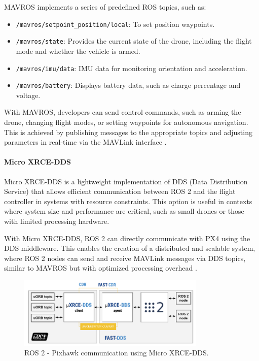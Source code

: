             MAVROS implements a series of predefined ROS topics, such as:
            \begin{itemize}
                \item \texttt{/mavros/setpoint\_position/local}: To set position waypoints.
                \item \texttt{/mavros/state}: Provides the current state of the drone, including the flight mode and whether the vehicle is armed.
                \item \texttt{/mavros/imu/data}: IMU data for monitoring orientation and acceleration.
                \item \texttt{/mavros/battery}: Displays battery data, such as charge percentage and voltage.
            \end{itemize}
            
            With MAVROS, developers can send control commands, such as arming the drone, changing flight modes, or setting waypoints for autonomous navigation. This is achieved by publishing messages to the appropriate topics and adjusting parameters in real-time via the MAVLink interface \cite{px4_ros2}.
            
            \begin{figure}
                \centering
                \label{fig:mavros}
            \end{figure}

            \paragraph{Micro XRCE-DDS}
            Micro XRCE-DDS is a lightweight implementation of DDS (Data Distribution Service) that allows efficient communication between ROS 2 and the flight controller in systems with resource constraints. This option is useful in contexts where system size and performance are critical, such as small drones or those with limited processing hardware.
    
            With Micro XRCE-DDS, ROS 2 can directly communicate with PX4 using the DDS middleware. This enables the creation of a distributed and scalable system, where ROS 2 nodes can send and receive MAVLink messages via DDS topics, similar to MAVROS but with optimized processing overhead \cite{px4_ros2}.
    
            \begin{figure}
                \centering
                \includegraphics[width=0.8\textwidth]{pictures/xrce_dds.png} 
                \caption{ROS 2 - Pixhawk communication using Micro XRCE-DDS.}
                \label{fig:xrce_dds}
            \end{figure}

